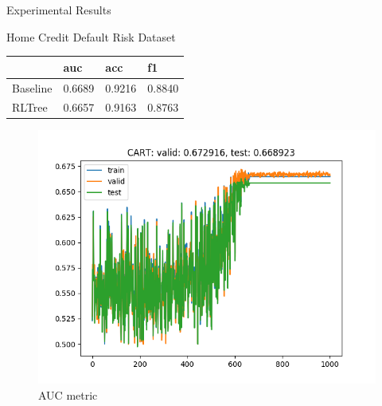 \documentclass{beamer}
\begin{document}
\begin{frame}{Experimental Results}
	\begin{block}{Home Credit Default Risk Dataset}
	\begin{table}[]
		\begin{tabular}{llll}
			\hline
			& auc    & acc    & f1     \\ \hline
			Baseline & 0.6689 & 0.9216 & 0.8840 \\
			RLTree   & 0.6657 & 0.9163 & 0.8763 \\ \hline
		\end{tabular}
	\end{table}
	\end{block}
	\begin{figure}{}
		\includegraphics[scale=0.4]{credit_auc_sample_curve}
		\caption{AUC metric}
	\end{figure}
\end{frame}
\end{document}
